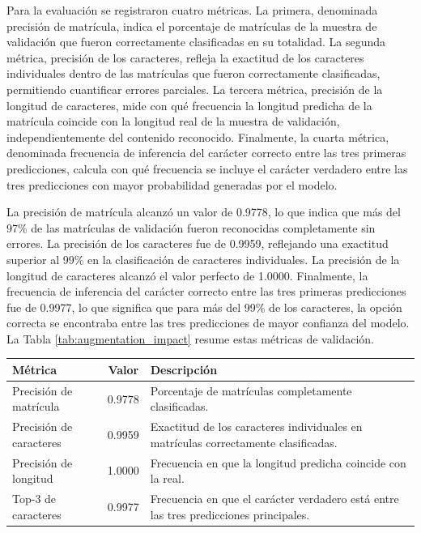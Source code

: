 Para la evaluación se registraron cuatro métricas. La primera, denominada precisión de matrícula, indica el porcentaje de matrículas de la muestra de validación que fueron correctamente clasificadas en su totalidad. La segunda métrica, precisión de los caracteres, refleja la exactitud de los caracteres individuales dentro de las matrículas que fueron correctamente clasificadas, permitiendo cuantificar errores parciales. La tercera métrica, precisión de la longitud de caracteres, mide con qué frecuencia la longitud predicha de la matrícula coincide con la longitud real de la muestra de validación, independientemente del contenido reconocido. Finalmente, la cuarta métrica, denominada frecuencia de inferencia del carácter correcto entre las tres primeras predicciones, calcula con qué frecuencia se incluye el carácter verdadero entre las tres predicciones con mayor probabilidad generadas por el modelo.

La precisión de matrícula alcanzó un valor de 0.9778, lo que indica que más del 97\% de las matrículas de validación fueron reconocidas completamente sin errores. La precisión de los caracteres fue de 0.9959, reflejando una exactitud superior al 99\% en la clasificación de caracteres individuales. La precisión de la longitud de caracteres alcanzó el valor perfecto de 1.0000. Finalmente, la frecuencia de inferencia del carácter correcto entre las tres primeras predicciones fue de 0.9977, lo que significa que para más del 99\% de los caracteres, la opción correcta se encontraba entre las tres predicciones de mayor confianza del modelo. La Tabla \ref{tab:augmentation_impact} resume estas métricas de validación.

\sffamily
\footnotesize
{}
\begin{tcolorbox}[
colback=white,
colframe=MASA-Blue,
title={Tabla~\thetable~Resumen de métricas de validación del reconocedor},
boxrule=0.5mm,
arc=2mm,
width=\textwidth,
enhanced,
fonttitle=\bfseries,
before upper=\vspace{2mm},
after upper=\vspace{2mm}
]
\label{tab:augmentation_impact}
\renewcommand{\arraystretch}{1.5}
\begin{tabularx}{\textwidth}{@{}l c X}
\textbf{Métrica} & \textbf{Valor} & \textbf{Descripción} \\
\midrule
Precisión de matrícula & 0.9778 & Porcentaje de matrículas completamente clasificadas. \\
Precisión de caracteres & 0.9959 & Exactitud de los caracteres individuales en matrículas correctamente clasificadas. \\
Precisión de longitud & 1.0000 & Frecuencia en que la longitud predicha coincide con la real. \\
Top-3 de caracteres & 0.9977 & Frecuencia en que el carácter verdadero está entre las tres predicciones principales. \\
\end{tabularx}
\end{tcolorbox}
\normalsize
\normalfont

